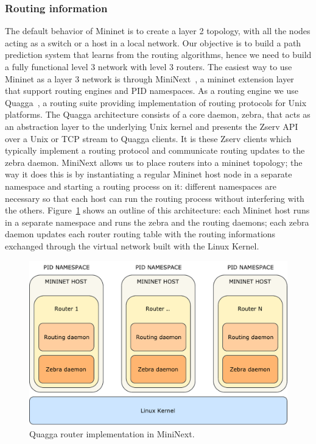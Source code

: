 \subsubsection{Routing information}
The default behavior of Mininet is to create a layer 2 topology, with all the nodes acting as a switch or a host in a local network. Our objective is to build a path prediction system that learns from the routing algorithms, hence we need to build a fully functional level 3 network with level 3 routers. The easiest way to use Mininet as a layer 3 network is through MiniNext~\cite{mininext}, a mininet extension layer that support routing engines and PID namespaces. As a routing engine we use Quagga~\cite{quagga}, a routing suite providing implementation of routing protocols for Unix platforms. The Quagga architecture consists of a core daemon, zebra, that acts as an abstraction layer to the underlying Unix kernel and presents the Zserv API over a Unix or TCP stream to Quagga clients. It is these Zserv clients which typically implement a routing protocol and communicate routing updates to the zebra daemon. MiniNext allows us to place routers into a mininet topology; the way it does this is by instantiating  a regular Mininet host node in a separate namespace and starting a routing process on it: different namespaces are necessary so that each host can run the routing process without interfering with the others. Figure~\ref{fig:quagga_mininext} shows an outline of this architecture: each Mininet host runs in a separate namespace and runs the zebra and the routing daemons; each zebra daemon updates each router routing table with the routing informations exchanged through the virtual network built with the Linux Kernel.

\begin{figure}
\centering
\includegraphics[width=\textwidth]{img/quagga_mininext}
\caption{Quagga router implementation in MiniNext.}
\label{fig:quagga_mininext}
\end{figure}

